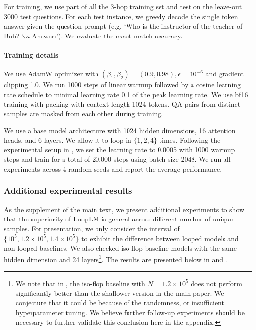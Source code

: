 \documentclass[]{bytedance_seed}
\newcommand{\1}{\mathbf{1}}
\newcommand{\ut}{LoopLM}
\begin{document}
{For training, we use part of all the 3-hop training set and test on the leave-out 3000 test questions. For each test instance, we greedy decode the single token answer given the question prompt (e.g. `Who is the instructor of the teacher of Bob? $\backslash n$ Answer:'). We evaluate the exact match accuracy.


\paragraph{Training details} We use AdamW optimizer with $(\beta_1,\beta_2)=(0.9,0.98), \epsilon=10^{-6}$ and gradient clipping 1.0. We run 1000 steps of linear warmup followed by a cosine learning rate schedule to minimal learning rate 0.1 of the peak learning rate. We use bf16 training with packing with context length 1024 tokens. QA pairs from distinct samples are masked from each other during training.

We use a base model architecture with 1024 hidden dimensions, 16 attention heads, and 6 layers. We allow it to loop in $\{1,2,4\}$ times. Following the experimental setup in \cite{yao2025language}, we set the learning rate to 0.0005 with 1000 warmup steps and train for a total of 20,000 steps using batch size 2048. We run all experiments across 4 random seeds and report the average performance. 

\subsubsection{Additional experimental results}
As the supplement of the main text, we present additional experiments to show that the superiority of \ut{} is general across different number of unique samples. For presentation, we only consider the interval of $\{10^5, 1.2\times 10^5, 1.4\times 10^5\}$ to exhibit the difference between looped models and non-looped baselines. We also checked iso-flop baseline models with the same hidden dimension and 24 layers\footnote{We note that in , the iso-flop baseline with $N=1.2\times 10^5$ does not perform significantly better than the shallower version in the main paper. We conjecture that it could be because of the randomness, or insufficient hyperparameter tuning. We believe further follow-up experiments should be necessary to further validate this conclusion here in the appendix.}. The results are presented below in  and .

}
\end{document}
